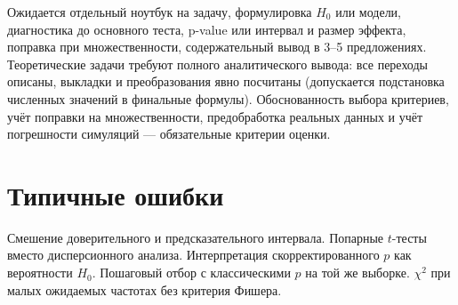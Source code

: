 Ожидается отдельный ноутбук на задачу, формулировка $H_0$ или модели, диагностика до основного теста, p-value или интервал и размер эффекта, поправка при множественности, содержательный вывод в 3--5 предложениях.
Теоретические задачи требуют полного аналитического вывода: все переходы описаны, выкладки и преобразования явно посчитаны (допускается подстановка численных значений в финальные формулы).
Обоснованность выбора критериев, учёт поправки на множественности, предобработка реальных данных и учёт погрешности симуляций --- обязательные критерии оценки.

\section{Типичные ошибки}

Смешение доверительного и предсказательного интервала. Попарные $t$-тесты вместо дисперсионного анализа. Интерпретация скорректированного $p$ как вероятности $H_0$. Пошаговый отбор с классическими $p$ на той же выборке. $\chi^2$ при малых ожидаемых частотах без критерия Фишера.
